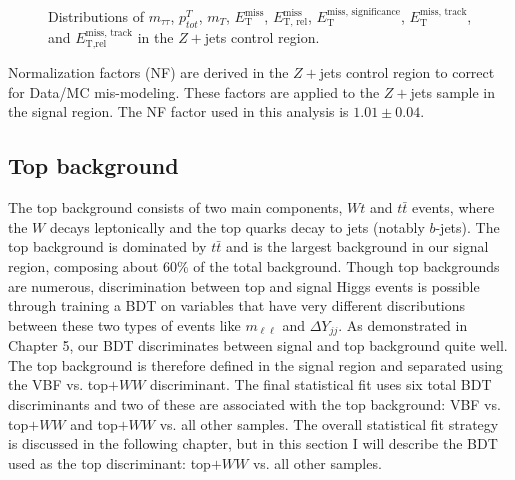 \begin{figure}[!h]
{  }\hfill
  \hfill
{\caption{Distributions of $m_{\tau\tau}$, $p^T_{tot}$, $m_T$, $\ensuremath{E_{\text{T}}^{\text{miss}}}$, $\ensuremath{E_{\text{T, rel}}^{\text{miss}}}$, $\ensuremath{E_{\text{T}}^{\text{miss, significance}}}$, $\ensuremath{E_{\text{T}}^{\text{miss, track}}}$, and $\ensuremath{E_{\text{T,rel}}^{\text{miss, track}}}$ in the $Z+$jets control region.
\label{fig:DYCR3}}}
\end{figure}

Normalization factors (NF) are derived in the $Z+$jets control region to correct for Data/MC mis-modeling. These factors are applied to the $Z+$jets sample in the signal region. The NF factor used in this analysis is $1.01 \pm 0.04$. 

\subsection{Top background}
The top background consists of two main components, $Wt$ and $t\bar{t}$ events, where the $W$ decays leptonically and the top quarks decay to jets (notably $b$-jets). The top background is dominated by $t\bar{t}$ and is the largest background in our signal region, composing about $60\%$ of the total background. Though top backgrounds are numerous, discrimination between top and signal Higgs events is possible through training a BDT on variables that have very different discributions between these two types of events like $m_{\ell\ell}$ and $\Delta Y_{jj}$. As demonstrated in Chapter 5, our BDT discriminates between signal and top background quite well. The top background is therefore defined in the signal region and separated using the VBF vs. top$+WW$ discriminant. The final statistical fit uses six total BDT discriminants and two of these are associated with the top background: VBF vs. top$+WW$ and top$+WW$ vs. all other samples. The overall statistical fit strategy is discussed in the following chapter, but in this section I will describe the BDT used as the top discriminant: top$+WW$ vs. all other samples. 

